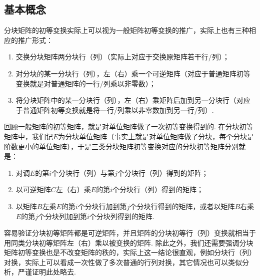 \subsection{基本概念}
分块矩阵的初等变换实际上可以视为一般矩阵初等变换的推广，实际上也有三种相应的推广形式：
\begin{enumerate}
    \item 交换分块矩阵两分块行（列）（实际上对应于交换原矩阵若干行/列）；

    \item 对分块的某一分块行（列），左（右）乘一个可逆矩阵（对应于普通矩阵初等变换就是对普通矩阵的一行/列乘以非零数）；

    \item 将分块矩阵中的某一分块行（列），左（右）乘矩阵后加到另一分块行（对应于普通矩阵初等变换就是将一行/列乘以非零数加到另一行/列）.
\end{enumerate}

回顾一般矩阵的初等矩阵，就是对单位矩阵做了一次初等变换得到的. 在分块初等矩阵中，我们记$E$为分块单位矩阵（事实上就是对单位矩阵做了分块，每个分块是阶数更小的单位矩阵），于是三类分块矩阵初等变换对应的分块初等矩阵分别就是：
\begin{enumerate}
    \item 对调$E$的第$i$个分块行（列）与第$j$个分块行（列）得到的矩阵；
    \item 以可逆矩阵$C$左（右）乘$E$的第$i$个分块行（列）得到的矩阵；
    \item 以矩阵$B$左乘$E$的第$i$个分块行加到第$j$个分块行得到的矩阵，或者以矩阵$B$右乘$E$的第$j$个分块列加到第$i$个分块列得到的矩阵.
\end{enumerate}

容易验证分块初等矩阵都是可逆矩阵，并且矩阵的分块初等行（列）变换就相当于用同类分块初等矩阵左（右）乘以被变换的矩阵. 除此之外，我们还需要强调分块矩阵初等变换也是不改变矩阵的秩的，实际上这一结论很直观，例如分块行（列）对换，实际上可以看成一次性做了多次普通的行列对换，其它情况也可以类似分析，严谨证明此处略去.

